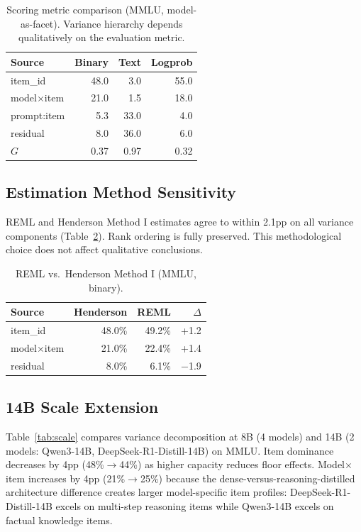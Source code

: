 \documentclass[11pt,twocolumn]{article}
\begin{document}
\begin{table}[t]
\centering
\caption{Scoring metric comparison (MMLU, model-as-facet). Variance hierarchy depends qualitatively on the evaluation metric.}
\label{tab:scoring}
\small
\begin{tabular}{@{}lrrr@{}}
\toprule
Source & Binary & Text & Logprob \\
\midrule
item\_id & 48.0 & 3.0 & 55.0 \\
model$\times$item & 21.0 & 1.5 & 18.0 \\
prompt:item & 5.3 & 33.0 & 4.0 \\
residual & 8.0 & 36.0 & 6.0 \\
\midrule
$G$ & 0.37 & 0.97 & 0.32 \\
\bottomrule
\end{tabular}
\end{table}

\subsection{Estimation Method Sensitivity}

REML and Henderson Method I estimates agree to within 2.1pp on all variance components (Table~\ref{tab:reml}). Rank ordering is fully preserved. This methodological choice does not affect qualitative conclusions.

\begin{table}[t]
\centering
\caption{REML vs.\ Henderson Method I (MMLU, binary).}
\label{tab:reml}
\small
\begin{tabular}{@{}lrrr@{}}
\toprule
Source & Henderson & REML & $\Delta$ \\
\midrule
item\_id & 48.0\% & 49.2\% & +1.2 \\
model$\times$item & 21.0\% & 22.4\% & +1.4 \\
residual & 8.0\% & 6.1\% & $-$1.9 \\
\bottomrule
\end{tabular}
\end{table}

\subsection{14B Scale Extension}
\label{sec:scale}

Table~\ref{tab:scale} compares variance decomposition at 8B (4 models) and 14B (2 models: Qwen3-14B, DeepSeek-R1-Distill-14B) on MMLU. Item dominance decreases by 4pp (48\%$\to$44\%) as higher capacity reduces floor effects. Model$\times$item increases by 4pp (21\%$\to$25\%) because the dense-versus-reasoning-distilled architecture difference creates larger model-specific item profiles: DeepSeek-R1-Distill-14B excels on multi-step reasoning items while Qwen3-14B excels on factual knowledge items.
\end{document}
